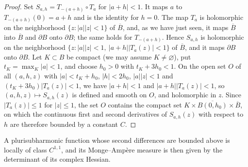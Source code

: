 \begin{proof}
Set $S_{a,h}=T_{-(a+h)}\circ T_a$ for $|a+h|<1$. It maps $a$ to $T_{-(a+h)}(0)=a+h$ and is the identity for $h=0$. The map $T_a$ is holomorphic on the neighborhood $\{z:|a||z|<1\}$ of $\overline B$, and, as we have just seen, it maps $\overline B$ into $\overline B$ and $\partial B$ onto $\partial B$; the same holds for $T_{-(a+h)}$. Hence $S_{a,h}$ is holomorphic on the neighborhood $\{z:|a||z|<1,\ |a+h||T_a(z)|<1\}$ of $\overline B$, and it maps $\partial B$ onto $\partial B$. Let $K\subset B$ be compact (we may assume $K\neq\varnothing$), put $t_K=\max_K|a|<1$, and choose $h_0>0$ with $t_K+3h_0<1$. On the open set $O$ of all $(a,h,z)$ with $|a|<t_K+h_0$, $|h|<2h_0$, $|a||z|<1$ and $(t_K+3h_0)|T_a(z)|<1$, we have $|a+h|<1$ and $|a+h||T_a(z)|<1$, so $(a,h,z)\mapsto S_{a,h}(z)$ is defined and smooth on $O$, and holomorphic in $z$. Since $|T_a(z)|\le1$ for $|z|\le1$, the set $O$ contains the compact set $K\times\overline{B(0,h_0)}\times\overline B$, on which the continuous first and second derivatives of $S_{a,h}(z)$ with respect to $h$ are therefore bounded by a constant $C$.
\end{proof}

A plurisubharmonic function whose second differences are bounded above is locally of class $C^{1,1}$, and its Monge--Amp\`ere measure is then given by the determinant of its complex Hessian.

